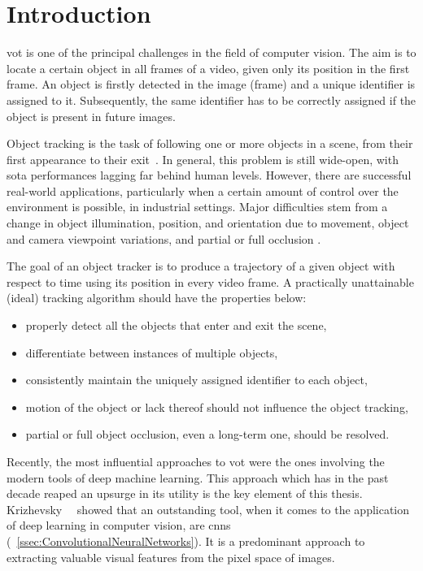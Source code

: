 \chapter{Introduction}
\label{chap:Introduction}

\gls{vot} is one of the principal challenges in the field of computer vision. The aim is to locate a certain object in all frames of a video, given only its position in the first frame. An object is firstly detected in the image (frame) and a unique identifier is assigned to it. Subsequently, the same identifier has to be correctly assigned if the object is present in future images.

Object tracking is the task of following one or more objects in a scene, from their first appearance to their exit~\cite{forsyth2012computer}. In general, this problem is still wide-open, with \gls{sota} performances lagging far behind human levels. However, there are successful real-world applications, particularly when a certain amount of control over the environment is possible, \egtext{} in industrial settings. Major difficulties stem from a change in object illumination, position, and orientation due to movement, object and camera viewpoint variations, and partial or full occlusion \cite{jalal2012sotavot}.

The goal of an object tracker is to produce a trajectory of a given object with respect to time using its position in every video frame. A practically unattainable (ideal) tracking algorithm should have the properties below:
\begin{itemize}
    \item properly detect all the objects that enter and exit the scene,
    \item differentiate between instances of multiple objects,
    \item consistently maintain the uniquely assigned identifier to each object,
    \item motion of the object or lack thereof should not influence the object tracking,
    \item partial or full object occlusion, even a long-term one, should be resolved.
\end{itemize}

Recently, the most influential approaches to \gls{vot} were the ones involving the modern tools of deep machine learning. This approach which has in the past decade reaped an upsurge in its utility is the key element of this thesis. Krizhevsky~\etal{}~\cite{krizhevsky2012classification} showed that an outstanding tool, when it comes to the application of deep learning in computer vision, are \glspl{cnn} (\sectiontext{}~\ref{ssec:ConvolutionalNeuralNetworks}). It is a predominant approach to extracting valuable visual features from the pixel space of images.

